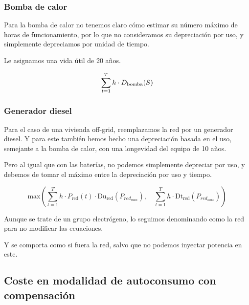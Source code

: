 \subsubsection{Bomba de calor}

Para la bomba de calor no tenemos claro cómo estimar su número máximo de horas
de funcionamiento, por lo que no consideramos su depreciación por uso, y
simplemente depreciamos por unidad de tiempo.

Le asignamos una vida útil de 20 años.

\begin{equation}
	\sum_{t=1}^{T} h \cdot D_\text{bomba}(S)                                                                                                        \\
\end{equation}


\subsubsection{Generador diesel}

Para el caso de una vivienda off-grid, reemplazamos la red por un generador
diesel. Y para este también hemos hecho una depreciación basada en el uso,
semejante a la bomba de calor, con una longevidad del equipo de 10 años.

Pero al igual que con las baterías, no podemos simplemente depreciar por uso, y
debemos de tomar el máximo entre la depreciación por uso y tiempo.

\begin{equation}
	\text{max} \left( \sum_{t=1}^{T} h \cdot P_\text{red}(t) \cdot \text{Du}_\text{red}(P_{red_{max}}), \quad \sum_{t=1}^{T} h \cdot \text{Dt}_\text{red}(P_{red_{max}}) \right)
\end{equation}

Aunque se trate de un grupo electrógeno, lo seguimos denominando como la red
para no modificar las ecuaciones.

Y se comporta como si fuera la red, salvo que no podemos inyectar potencia en
este.


\subsection{Coste en modalidad de autoconsumo con compensación}

